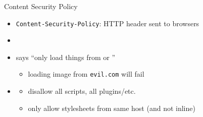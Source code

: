 
\begin{frame}[fragile,label=CSPExs]{Content Security Policy}
    \begin{itemize}
        \item \texttt{Content-Security-Policy}: HTTP header sent to browsers
        \item {}
        \item says ``only load things from  or ''
            \begin{itemize}
            \item loading image from \texttt{evil.com} will fail
            \end{itemize}
        \item {}
            \begin{itemize}
            \item disallow all scripts, all plugins/etc.
            \item only allow stylesheets from same host (and not inline)
            \end{itemize}
    \end{itemize}

\end{frame}

